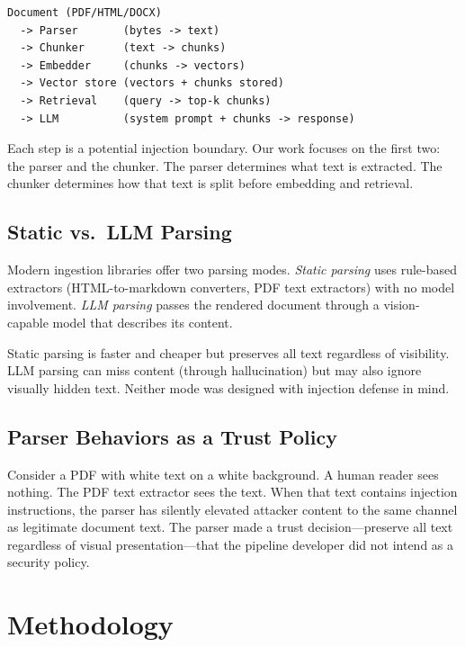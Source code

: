\documentclass[conference,compsoc]{IEEEtran}
\begin{document}
\begin{lstlisting}[basicstyle=\ttfamily\footnotesize, breaklines=true]
Document (PDF/HTML/DOCX)
  -> Parser       (bytes -> text)
  -> Chunker      (text -> chunks)
  -> Embedder     (chunks -> vectors)
  -> Vector store (vectors + chunks stored)
  -> Retrieval    (query -> top-k chunks)
  -> LLM          (system prompt + chunks -> response)
\end{lstlisting}

Each step is a potential injection boundary. Our work focuses on the first two:
the parser and the chunker. The parser determines what text is extracted. The
chunker determines how that text is split before embedding and retrieval.

\subsection{Static vs.\ LLM Parsing}

Modern ingestion libraries offer two parsing modes. \emph{Static parsing} uses
rule-based extractors (HTML-to-markdown converters, PDF text extractors) with
no model involvement. \emph{LLM parsing} passes the rendered document through a
vision-capable model that describes its content.

Static parsing is faster and cheaper but preserves all text regardless of
visibility. LLM parsing can miss content (through hallucination) but may also
ignore visually hidden text. Neither mode was designed with injection defense in
mind.

\subsection{Parser Behaviors as a Trust Policy}

Consider a PDF with white text on a white background. A human reader sees
nothing. The PDF text extractor sees the text. When that text contains injection
instructions, the parser has silently elevated attacker content to the same
channel as legitimate document text. The parser made a trust decision---preserve
all text regardless of visual presentation---that the pipeline developer did not
intend as a security policy.


\section{Methodology}
\end{document}
